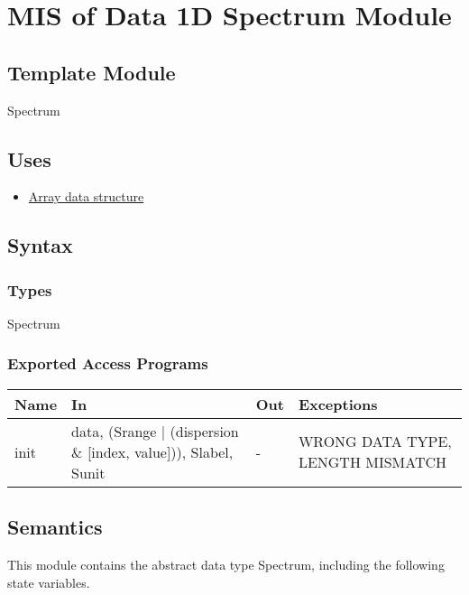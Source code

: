 \documentclass[12pt, titlepage]{article}
\begin{document}
\section{MIS of Data 1D Spectrum Module} \label{Mod:Spectrum}
\subsection{Template Module}
Spectrum

\subsection{Uses}
\begin{itemize}
    \item \hyperref[Mod:Array]{Array data structure}
\end{itemize}

\subsection{Syntax}

\subsubsection{Types}
Spectrum

\subsubsection{Exported Access Programs}

\begin{center}
    \begin{tabular}{p{1.5cm} p{4cm} p{4cm} p{4cm}}
        \toprule
        \textbf{Name} & \textbf{In} & \textbf{Out} & \textbf{Exceptions} \\
        \midrule
        init & data, (Srange $|$ (dispersion $\&$ [index, value])), Slabel, Sunit & - &
        WRONG DATA TYPE, LENGTH MISMATCH \\
        \bottomrule
    \end{tabular}
\end{center}

\subsection{Semantics}
This module contains the abstract data type Spectrum, including the following
state variables.
\end{document}
